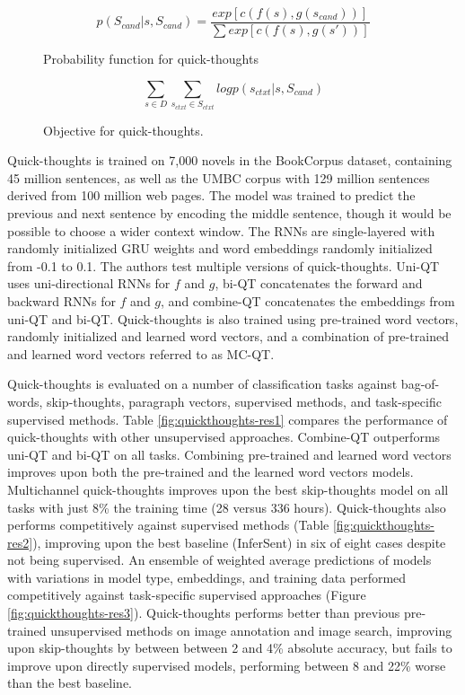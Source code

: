 \begin{figure}[h!]
    \centering
    $$
    p(S_{cand}|s, S_{cand}) = \frac{exp[c(f(s),g(s_{cand}))]}{\sum exp[c(f(s),g(s'))]}
    $$
    \caption{Probability function for quick-thoughts}
    \label{fig:quickthoughts-prob}
\end{figure}

\begin{figure}[h!]
    \centering
    $$
    \sum\limits_{s \in D} \sum\limits_{s_{ctxt} \in S_{ctxt}} log p(s_{ctxt} | s, S_{cand})
    $$
    \caption{Objective for quick-thoughts.}
    \label{fig:quickthoughts-obj}
\end{figure}

Quick-thoughts is trained on 7,000 novels in the BookCorpus dataset, containing 45 million sentences, as well as the UMBC corpus with 129 million sentences derived from 100 million web pages. The model was trained to predict the previous and next sentence by encoding the middle sentence, though it would be possible to choose a wider context window. The RNNs are single-layered with randomly initialized GRU weights and word embeddings randomly initialized from -0.1 to 0.1. The authors test multiple versions of quick-thoughts. Uni-QT uses uni-directional RNNs for $f$ and $g$, bi-QT concatenates the forward and backward RNNs for $f$ and $g$, and combine-QT concatenates the embeddings from uni-QT and bi-QT. Quick-thoughts is also trained using pre-trained word vectors, randomly initialized and learned word vectors, and a combination of pre-trained and learned word vectors referred to as MC-QT. 

Quick-thoughts is evaluated on a number of classification tasks against bag-of-words, skip-thoughts, paragraph vectors, supervised methods, and task-specific supervised methods. Table \ref{fig:quickthoughts-res1} compares the performance of quick-thoughts with other unsupervised approaches. Combine-QT outperforms uni-QT and bi-QT on all tasks. Combining pre-trained and learned word vectors improves upon both the pre-trained and the learned word vectors models. Multichannel quick-thoughts improves upon the best skip-thoughts model on all tasks with just 8\% the training time (28 versus 336 hours). Quick-thoughts also performs competitively against supervised methods (Table \ref{fig:quickthoughts-res2}), improving upon the best baseline (InferSent) in six of eight cases despite not being supervised. An ensemble of weighted average predictions of models with variations in model type, embeddings, and training data performed competitively against task-specific supervised approaches (Figure \ref{fig:quickthoughts-res3}). Quick-thoughts performs better than previous pre-trained unsupervised methods on image annotation and image search, improving upon skip-thoughts by between between 2 and 4\% absolute accuracy, but fails to improve upon directly supervised models, performing between 8 and 22\% worse than the best baseline.

